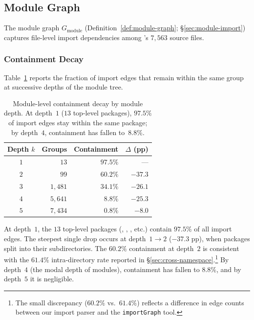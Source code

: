 \subsection{Module Graph}\label{app:module-detail}

The module graph $G_{\mathrm{module}}$ (Definition~\ref{def:module-graph}; \S\ref{sec:module-import}) captures file-level import dependencies among 's $7{,}563$ source files.

\subsubsection{Containment Decay}

Table~\ref{tab:module-containment} reports the fraction of import edges that remain within the same group at successive depths of the module tree.

\begin{table}[ht]
\centering
\caption{Module-level containment decay by module depth. At depth~$1$ ($13$ top-level packages), $97.5\%$ of import edges stay within the same package; by depth~$4$, containment has fallen to~$8.8\%$.}
\label{tab:module-containment}
\begin{tabular}{crrr}
\toprule
Depth $k$ & Groups & Containment & $\Delta$ (pp) \\
\midrule
$1$ & $13$      & $97.5\%$  & ---     \\
$2$ & $99$      & $60.2\%$  & $-37.3$ \\
$3$ & $1{,}481$ & $34.1\%$  & $-26.1$ \\
$4$ & $5{,}641$ & $8.8\%$   & $-25.3$ \\
$5$ & $7{,}434$ & $0.8\%$   & $-8.0$  \\
\bottomrule
\end{tabular}
\end{table}

At depth~$1$, the $13$ top-level packages (, , , etc.) contain $97.5\%$ of all import edges. The steepest single drop occurs at depth~$1 \to 2$ ($-37.3$ pp), when packages split into their subdirectories. The $60.2\%$ containment at depth~$2$ is consistent with the $61.4\%$ intra-directory rate reported in \S\ref{sec:cross-namespace}.\footnote{The small discrepancy ($60.2\%$ vs.\ $61.4\%$) reflects a difference in edge counts between our import parser and the \texttt{importGraph} tool.} By depth~$4$ (the modal depth of modules), containment has fallen to $8.8\%$, and by depth~$5$ it is negligible.

